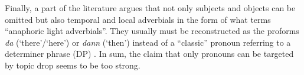 %

\noindent Finally, a part of the literature argues that not only subjects and objects can be omitted but also temporal and local adverbials  in the form of what \citet[289, footnote 33]{sigurdsson2011} terms ``anaphoric light adverbials''. 
They usually must be reconstructed as the proforms \textit{da} (`there'/`here') or \textit{dann} (`then') instead of a ``classic'' pronoun referring to a determiner phrase (DP)  \citep{fries1988, sigurdsson2011, schalowski2015}.
In sum, the claim that only pronouns can be targeted by topic drop seems to be too strong.

